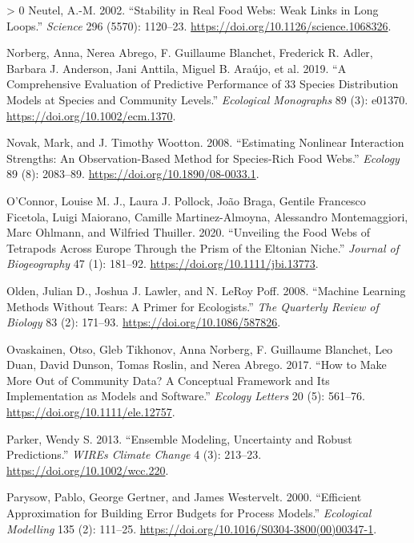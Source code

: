 \documentclass[10pt,oneside]{article}
\newlength{\cslhangindent}
\newenvironment{CSLReferences}[3] %
 {%
  \setlength{\parindent}{0pt}
  \ifodd #1 \everypar{\setlength{\hangindent}{\cslhangindent}}\ignorespaces\fi
  \ifnum #2 > 0
  \setlength{\parskip}{#2\baselineskip}
  \fi
 }%
 {}
\begin{document}
\begin{CSLReferences}{1}{0}
\leavevmode\hypertarget{ref-Neutel2002StaRea}{}%
Neutel, A.-M. 2002. {``Stability in Real Food Webs: Weak Links in Long
Loops.''} \emph{Science} 296 (5570): 1120--23.
\url{https://doi.org/10.1126/science.1068326}.

\leavevmode\hypertarget{ref-Norberg2019ComEva}{}%
Norberg, Anna, Nerea Abrego, F. Guillaume Blanchet, Frederick R. Adler,
Barbara J. Anderson, Jani Anttila, Miguel B. Araújo, et al. 2019. {``A
Comprehensive Evaluation of Predictive Performance of 33 Species
Distribution Models at Species and Community Levels.''} \emph{Ecological
Monographs} 89 (3): e01370. \url{https://doi.org/10.1002/ecm.1370}.

\leavevmode\hypertarget{ref-Novak2008EstNon}{}%
Novak, Mark, and J. Timothy Wootton. 2008. {``Estimating Nonlinear
Interaction Strengths: An Observation-Based Method for Species-Rich Food
Webs.''} \emph{Ecology} 89 (8): 2083--89.
\url{https://doi.org/10.1890/08-0033.1}.

\leavevmode\hypertarget{ref-OConnor2020UnvFoo}{}%
O'Connor, Louise M. J., Laura J. Pollock, João Braga, Gentile Francesco
Ficetola, Luigi Maiorano, Camille Martinez-Almoyna, Alessandro
Montemaggiori, Marc Ohlmann, and Wilfried Thuiller. 2020. {``Unveiling
the Food Webs of Tetrapods Across Europe Through the Prism of the
Eltonian Niche.''} \emph{Journal of Biogeography} 47 (1): 181--92.
\url{https://doi.org/10.1111/jbi.13773}.

\leavevmode\hypertarget{ref-Olden2008MacLea}{}%
Olden, Julian D., Joshua J. Lawler, and N. LeRoy Poff. 2008. {``Machine
Learning Methods Without Tears: A Primer for Ecologists.''} \emph{The
Quarterly Review of Biology} 83 (2): 171--93.
\url{https://doi.org/10.1086/587826}.

\leavevmode\hypertarget{ref-Ovaskainen2017HowMak}{}%
Ovaskainen, Otso, Gleb Tikhonov, Anna Norberg, F. Guillaume Blanchet,
Leo Duan, David Dunson, Tomas Roslin, and Nerea Abrego. 2017. {``How to
Make More Out of Community Data? A Conceptual Framework and Its
Implementation as Models and Software.''} \emph{Ecology Letters} 20 (5):
561--76. \url{https://doi.org/10.1111/ele.12757}.

\leavevmode\hypertarget{ref-Parker2013EnsMod}{}%
Parker, Wendy S. 2013. {``Ensemble Modeling, Uncertainty and Robust
Predictions.''} \emph{WIREs Climate Change} 4 (3): 213--23.
\url{https://doi.org/10.1002/wcc.220}.

\leavevmode\hypertarget{ref-Parysow2000EffApp}{}%
Parysow, Pablo, George Gertner, and James Westervelt. 2000. {``Efficient
Approximation for Building Error Budgets for Process Models.''}
\emph{Ecological Modelling} 135 (2): 111--25.
\url{https://doi.org/10.1016/S0304-3800(00)00347-1}.


\end{CSLReferences}
\end{document}

